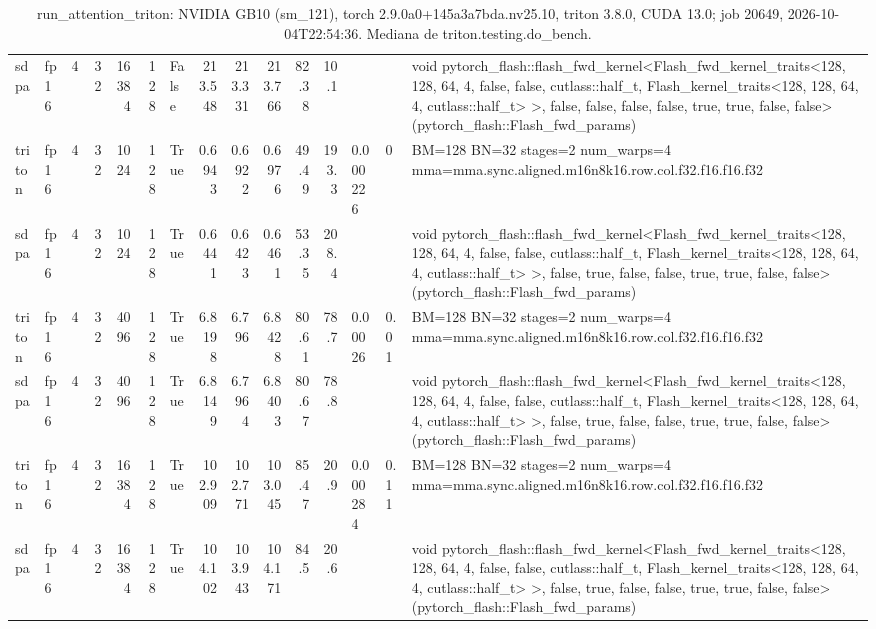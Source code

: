 \begin{table}[htbp]
\begin{tabular}{llrrrrlrrrrrlll}
    sdpa & fp16 & 4 & 32 & 16384 & 128 & False & 213.548 & 213.331 & 213.766 & 82.38 & 10.1 &  &  & void pytorch\_flash::flash\_fwd\_kernel<Flash\_fwd\_kernel\_traits<128, 128, 64, 4, false, false, cutlass::half\_t, Flash\_kernel\_traits<128, 128, 64, 4, cutlass::half\_t> >, false, false, false, false, true, true, false, false>(pytorch\_flash::Flash\_fwd\_params) \\
    triton & fp16 & 4 & 32 & 1024 & 128 & True & 0.6943 & 0.6922 & 0.6976 & 49.49 & 193.3 & 0.000226 & 0 & BM=128 BN=32 stages=2 num\_warps=4 mma=mma.sync.aligned.m16n8k16.row.col.f32.f16.f16.f32 \\
    sdpa & fp16 & 4 & 32 & 1024 & 128 & True & 0.6441 & 0.6423 & 0.6461 & 53.35 & 208.4 &  &  & void pytorch\_flash::flash\_fwd\_kernel<Flash\_fwd\_kernel\_traits<128, 128, 64, 4, false, false, cutlass::half\_t, Flash\_kernel\_traits<128, 128, 64, 4, cutlass::half\_t> >, false, true, false, false, true, true, false, false>(pytorch\_flash::Flash\_fwd\_params) \\
    triton & fp16 & 4 & 32 & 4096 & 128 & True & 6.8198 & 6.796 & 6.8428 & 80.61 & 78.7 & 0.00026 & 0.01 & BM=128 BN=32 stages=2 num\_warps=4 mma=mma.sync.aligned.m16n8k16.row.col.f32.f16.f16.f32 \\
    sdpa & fp16 & 4 & 32 & 4096 & 128 & True & 6.8149 & 6.7964 & 6.8403 & 80.67 & 78.8 &  &  & void pytorch\_flash::flash\_fwd\_kernel<Flash\_fwd\_kernel\_traits<128, 128, 64, 4, false, false, cutlass::half\_t, Flash\_kernel\_traits<128, 128, 64, 4, cutlass::half\_t> >, false, true, false, false, true, true, false, false>(pytorch\_flash::Flash\_fwd\_params) \\
    triton & fp16 & 4 & 32 & 16384 & 128 & True & 102.909 & 102.771 & 103.045 & 85.47 & 20.9 & 0.000284 & 0.11 & BM=128 BN=32 stages=2 num\_warps=4 mma=mma.sync.aligned.m16n8k16.row.col.f32.f16.f16.f32 \\
    sdpa & fp16 & 4 & 32 & 16384 & 128 & True & 104.102 & 103.943 & 104.171 & 84.5 & 20.6 &  &  & void pytorch\_flash::flash\_fwd\_kernel<Flash\_fwd\_kernel\_traits<128, 128, 64, 4, false, false, cutlass::half\_t, Flash\_kernel\_traits<128, 128, 64, 4, cutlass::half\_t> >, false, true, false, false, true, true, false, false>(pytorch\_flash::Flash\_fwd\_params) \\
    \bottomrule
  \end{tabular}
  \caption{run\_attention\_triton: NVIDIA GB10 (sm\_121), torch 2.9.0a0+145a3a7bda.nv25.10, triton 3.8.0, CUDA 13.0; job 20649, 2026-10-04T22:54:36. Mediana de triton.testing.do\_bench.}
  \label{tab:run-attention-triton}
\end{table}
